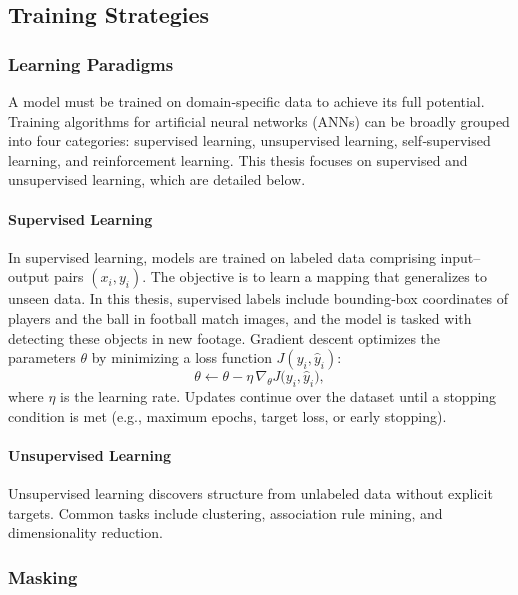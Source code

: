\subsection{Training Strategies}
\label{ssec:training_stratergies}
\subsubsection{Learning Paradigms}
A model must be trained on domain‑specific data to achieve its full potential. Training algorithms for artificial neural networks (ANNs) can be broadly grouped into four categories: supervised learning, unsupervised learning, self‑supervised learning, and reinforcement learning. This thesis focuses on supervised and unsupervised learning, which are detailed below.

\paragraph{Supervised Learning}
In supervised learning, models are trained on labeled data comprising input–output pairs \((x_i, y_i)\). The objective is to learn a mapping that generalizes to unseen data. In this thesis, supervised labels include bounding‑box coordinates of players and the ball in football match images, and the model is tasked with detecting these objects in new footage. Gradient descent optimizes the parameters \(\theta\) by minimizing a loss function \(J(y_i, \hat y_i)\):  
\[
\theta \leftarrow \theta - \eta \,\nabla_{\theta}J\bigl(y_i,\hat y_i\bigr),
\]
where \(\eta\) is the learning rate. Updates continue over the dataset until a stopping condition is met (e.g., maximum epochs, target loss, or early stopping).

\paragraph{Unsupervised Learning}
Unsupervised learning discovers structure from unlabeled data without explicit targets. Common tasks include clustering, association rule mining, and dimensionality reduction. 

\subsubsection{Masking}

